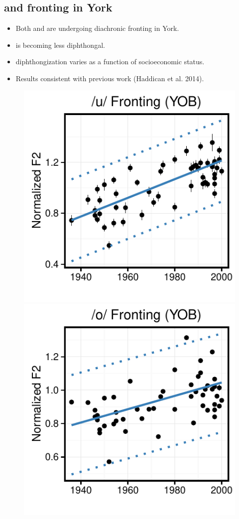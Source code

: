 \documentclass[a0,portrait]{a0poster}
\begin{document}
\begin{multicols}{3}
\section*{ and  fronting in York}
\normalsize
\begin{itemize}
\item{Both  and  are undergoing diachronic fronting in York.}
\item{ is becoming less diphthongal.}
\item{ diphthongization varies as a function of socioeconomic status.}
\item{Results consistent with previous work (Haddican et al. 2014).}
\end{itemize}
\begin{figure}[H]
\centering
\includegraphics[scale=1.65]{u_fronting_yob.pdf}\includegraphics[scale=1.65]{o_fronting_yob.pdf} 

\end{figure}
\end{multicols}
\end{document}
